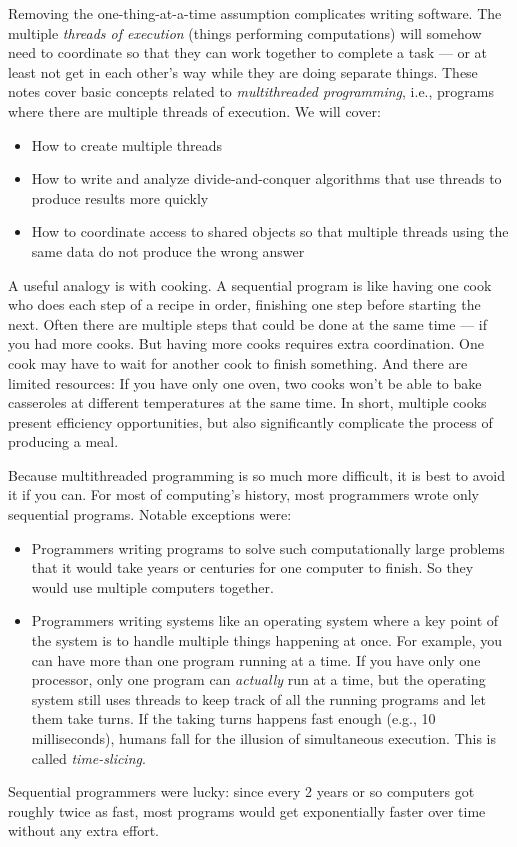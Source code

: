 \documentclass[10pt]{article}
\begin{document}
Removing the one-thing-at-a-time assumption complicates writing
software.  The multiple \emph{threads of execution} (things performing
computations) will somehow need to coordinate so that they can work
together to complete a task --- or at least not get in each other's
way while they are doing separate things.  These notes cover basic
concepts related to \emph{multithreaded programming}, i.e., programs
where there are multiple threads of execution.  We will
cover:
\begin{itemize}
\item How to create multiple threads
\item How to write and analyze divide-and-conquer algorithms that use  
  threads to produce results more quickly
\item How to coordinate access to shared objects so that multiple
  threads using the same data do not produce the wrong answer
\end{itemize}

A useful analogy is with cooking.  A sequential program is like having
one cook who does each step of a recipe in order, finishing one step
before starting the next.  Often there are multiple steps that could
be done at the same time --- if you had more cooks.  But having more
cooks requires extra coordination.  One cook may have to wait for
another cook to finish something.  And there are limited resources: If
you have only one oven, two cooks won't be able to bake casseroles at
different temperatures at the same time.  In short, multiple cooks
present efficiency opportunities, but also significantly
complicate the process of producing a meal.

Because multithreaded programming is so much more difficult, it is
best to avoid it if you can.  For most of computing's history, most
programmers wrote only sequential programs.  Notable exceptions were:
\begin{itemize}
\item Programmers writing programs to solve such computationally large
  problems that it would take years or centuries for one computer to
  finish.  So they would use multiple computers together.
\item Programmers writing systems like an operating system where a key
  point of the system is to handle multiple things happening at once.
  For example, you can have more than one program running at a time.
  If you have only one processor, only one program can \emph{actually}
  run at a time, but the operating system still uses threads to keep
  track of all the running programs and let them take turns.  If the
  taking turns happens fast enough (e.g., 10 milliseconds), humans
  fall for the illusion of simultaneous execution.  This is called
  \emph{time-slicing}.
\end{itemize}
Sequential programmers were lucky: since every 2 years or so computers
got roughly twice as fast, most programs would get exponentially
faster over time without any extra effort.
\end{document}
